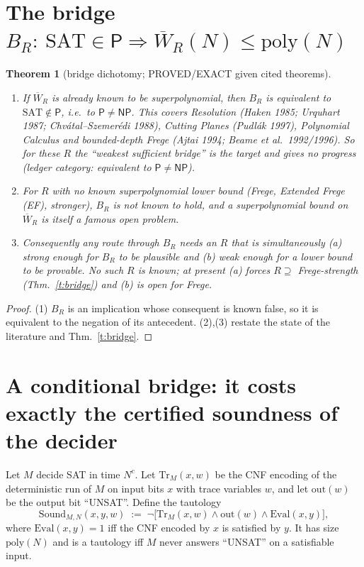 \documentclass[11pt]{article}
\newtheorem{theorem}{Theorem}
\theoremstyle{remark}
\newcommand{\Wbar}{\overline W}
\begin{document}
\section{The bridge $B_R:\ \mathrm{SAT}\in\mathsf P\Rightarrow\Wbar_R(N)\le\mathrm{poly}(N)$}

\begin{theorem}[bridge dichotomy; PROVED/EXACT given cited theorems]\label{t:dich}
\begin{enumerate}
\item If $\Wbar_R$ is already known to be superpolynomial, then $B_R$ is \emph{equivalent} to
$\mathrm{SAT}\notin\mathsf P$, i.e.\ to $\mathsf P\ne\mathsf{NP}$. This covers Resolution (Haken 1985;
Urquhart 1987; Chv\'atal--Szemer\'edi 1988), Cutting Planes (Pudl\'ak 1997), Polynomial Calculus
and bounded-depth Frege (Ajtai 1994; Beame et al.\ 1992/1996). So for these $R$ the
``weakest sufficient bridge'' \emph{is} the target and gives no progress
(ledger category: equivalent to $\mathsf P\ne\mathsf{NP}$).
\item For $R$ with no known superpolynomial lower bound (Frege, Extended Frege (EF), stronger),
$B_R$ is not known to hold, and a superpolynomial bound on $\Wbar_R$ is itself a famous
open problem.
\item Consequently any route through $B_R$ needs an $R$ that is simultaneously (a) strong
enough for $B_R$ to be plausible and (b) weak enough for a lower bound to be provable.
No such $R$ is known; at present (a) forces $R\supseteq$ Frege-strength (Thm.~\ref{t:bridge}) and (b)
is open for Frege.
\end{enumerate}
\end{theorem}
\begin{proof} (1) $B_R$ is an implication whose consequent is known false, so it is
equivalent to the negation of its antecedent. (2),(3) restate the state of the literature
and Thm.~\ref{t:bridge}.\end{proof}

\section{A conditional bridge: it costs exactly the certified soundness of the decider}

Let $M$ decide SAT in time $N^c$. Let $\mathrm{Tr}_M(x,w)$ be the CNF encoding of the deterministic
run of $M$ on input bits $x$ with trace variables $w$, and let $\mathrm{out}(w)$ be the
output bit ``UNSAT''. Define the tautology
\[
\mathrm{Sound}_{M,N}(x,y,w)\;:=\;\neg\big[\mathrm{Tr}_M(x,w)\wedge \mathrm{out}(w)\wedge \mathrm{Eval}(x,y)\big],
\]
where $\mathrm{Eval}(x,y)=1$ iff the CNF encoded by $x$ is satisfied by $y$. It has size $\mathrm{poly}(N)$ and is a
tautology iff $M$ never answers ``UNSAT'' on a satisfiable input.
\end{document}
